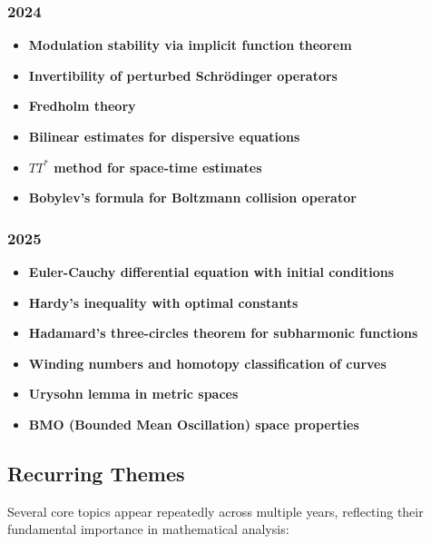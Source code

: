 \subsubsection*{2024}
\begin{itemize}
    \item \textbf{Modulation stability via implicit function theorem}
    \item \textbf{Invertibility of perturbed Schr\"odinger operators}
    \item \textbf{Fredholm theory}
    \item \textbf{Bilinear estimates for dispersive equations}
    \item \textbf{$TT^*$ method for space-time estimates}
    \item \textbf{Bobylev's formula for Boltzmann collision operator}
\end{itemize}

\subsubsection*{2025}
\begin{itemize}
    \item \textbf{Euler-Cauchy differential equation with initial conditions}
    \item \textbf{Hardy's inequality with optimal constants}
    \item \textbf{Hadamard's three-circles theorem for subharmonic functions}
    \item \textbf{Winding numbers and homotopy classification of curves}
    \item \textbf{Urysohn lemma in metric spaces}
    \item \textbf{BMO (Bounded Mean Oscillation) space properties}
\end{itemize}

\subsection{Recurring Themes}

Several core topics appear repeatedly across multiple years, reflecting their fundamental importance in mathematical analysis:

